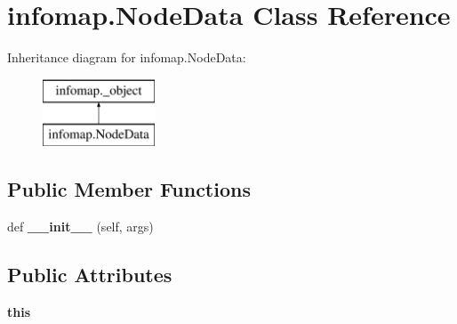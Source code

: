 \hypertarget{classinfomap_1_1NodeData}{}\section{infomap.\+Node\+Data Class Reference}
\label{classinfomap_1_1NodeData}
Inheritance diagram for infomap.\+Node\+Data\+:\begin{figure}[H]
\begin{center}
\leavevmode
\includegraphics[height=2.000000cm]{classinfomap_1_1NodeData}
\end{center}
\end{figure}
\subsection*{Public Member Functions}
\begin{DoxyCompactItemize}
\item 
\mbox{\label{classinfomap_1_1NodeData_a634e8541de7a641832fca69355315eaf}} 
def {\bfseries \+\_\+\+\_\+init\+\_\+\+\_\+} (self, args)
\end{DoxyCompactItemize}
\subsection*{Public Attributes}
\begin{DoxyCompactItemize}
\item 
\mbox{\label{classinfomap_1_1NodeData_aad0bc35b074fbf728709026edf2a8c60}} 
{\bfseries this}
\end{DoxyCompactItemize}
